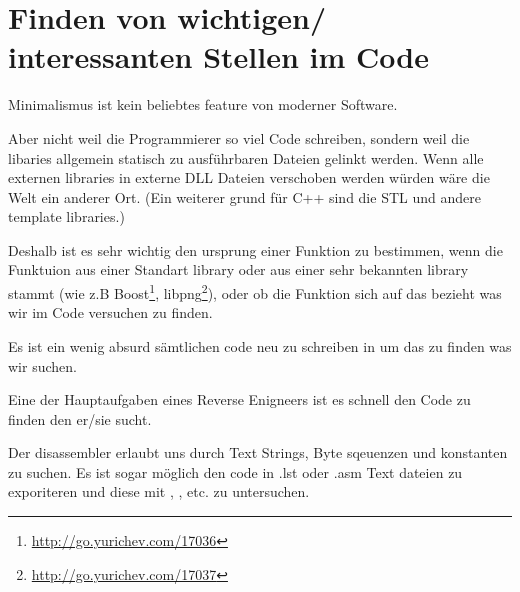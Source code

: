 \chapter{Finden von wichtigen/ interessanten Stellen im Code}

Minimalismus ist kein beliebtes feature von moderner Software.


Aber nicht weil die Programmierer so viel Code schreiben, sondern weil die libaries allgemein statisch zu ausführbaren
Dateien gelinkt werden. 
Wenn alle externen libraries in externe DLL Dateien verschoben werden würden wäre die Welt ein anderer Ort.
(Ein weiterer grund für C++ sind die \ac{STL} und andere template libraries.)


\newcommand{\FOOTNOTEBOOST}{\footnote{\url{http://go.yurichev.com/17036}}}
\newcommand{\FOOTNOTELIBPNG}{\footnote{\url{http://go.yurichev.com/17037}}}

Deshalb ist es sehr wichtig den ursprung einer Funktion zu bestimmen, wenn die Funktuion aus 
einer Standart library oder aus einer sehr bekannten library stammt (wie z.B Boost\FOOTNOTEBOOST, libpng\FOOTNOTELIBPNG),
oder ob die Funktion sich auf das bezieht was wir im Code versuchen zu finden.


Es ist ein wenig absurd sämtlichen code neu zu schreiben in \CCpp um das zu finden 
was wir suchen.

Eine der Hauptaufgaben eines Reverse Enigneers ist es schnell den Code zu finden den er/sie sucht. %

\myindex{\GrepUsage}

Der \IDA disassembler erlaubt uns durch Text Strings, Byte sqeuenzen und konstanten zu suchen. %
Es ist sogar möglich den code in .lst oder .asm Text dateien zu exporiteren und diese mit , , etc. zu untersuchen.

